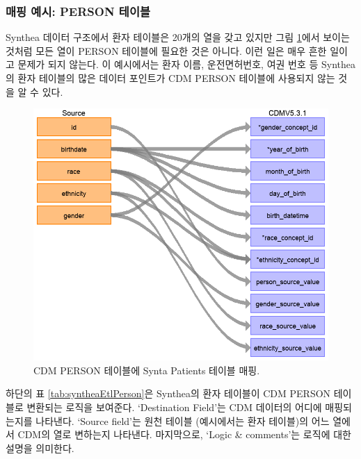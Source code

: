 \documentclass[10.5pt]{book}
\theoremstyle{definition}
\theoremstyle{definition}
\theoremstyle{definition}
\theoremstyle{remark}
\begin{document}
\subsubsection*{매핑 예시: PERSON 테이블}\label{--person-}

Synthea 데이터 구조에서 환자 테이블은 20개의 열을 갖고 있지만 그림
\ref{fig:syntheaPerson}에서 보이는 것처럼 모든 열이 PERSON 테이블에
필요한 것은 아니다. 이런 일은 매우 흔한 일이고 문제가 되지 않는다. 이
예시에서는 환자 이름, 운전면허번호, 여권 번호 등 Synthea의 환자 테이블의
많은 데이터 포인트가 CDM PERSON 테이블에 사용되지 않는 것을 알 수 있다.

\begin{figure}

{\centering \includegraphics[width=1\linewidth]{images/ExtractTransformLoad/syntheaPersonTable} 

}

\caption{CDM PERSON 테이블에 Synta Patients 테이블 매핑.}\label{fig:syntheaPerson}
\end{figure}

하단의 표 \ref{tab:syntheaEtlPerson}은 Synthea의 환자 테이블이 CDM
PERSON 테이블로 변환되는 로직을 보여준다. `Destination Field'는 CDM
데이터의 어디에 매핑되는지를 나타낸다. `Source field'는 원천 테이블
(예시에서는 환자 테이블)의 어느 열에서 CDM의 열로 변하는지 나타낸다.
마지막으로, `Logic \& comments'는 로직에 대한 설명을 의미한다.
\end{document}
